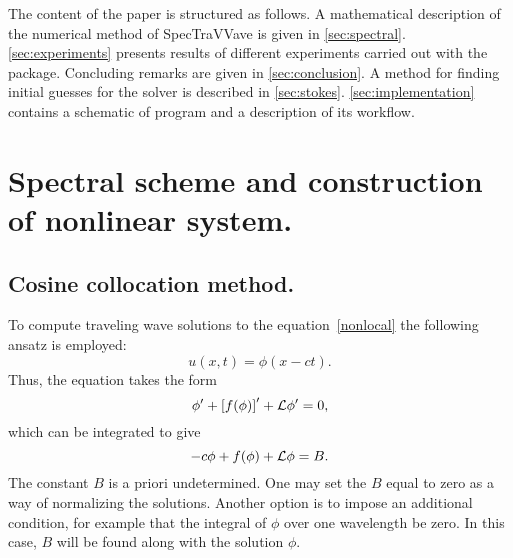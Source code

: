 The content of the paper is structured as follows. A mathematical description of the numerical method of 
\textsf{SpecTraVVave} is given in \autoref{sec:spectral}. \autoref{sec:experiments} presents results of different experiments carried out with the package. Concluding remarks are given in \autoref{sec:conclusion}. A method for finding initial guesses for the solver is described in \autoref{sec:stokes}. \autoref{sec:implementation} contains a schematic of program and a description of its workflow.

\section{Spectral scheme and construction of nonlinear system.}
\label{sec:spectral}
\subsection{Cosine collocation method.}
To compute traveling wave solutions to the equation~\eqref{nonlocal} the following ansatz is employed:
\begin{equation*}%
u(x,t) = \phi(x-ct).
\end{equation*}
Thus, the equation takes the form
\begin{equation*}%
\phi' + \left[f(\phi) \right]' + \Lop \phi' = 0,
\end{equation*}
which can be integrated to give
\begin{equation}\label{int_gen1}
-c \phi + f(\phi)  + \mathcal{L} \phi = B. 
\end{equation}
The constant $B$ is a priori undetermined. One may set the $B$ equal to 
zero as a way of normalizing the solutions. Another option is to impose
an additional condition, for example that the integral of $\phi$ over
one wavelength be zero. In this case, $B$ will be found along with the solution $\phi$.


